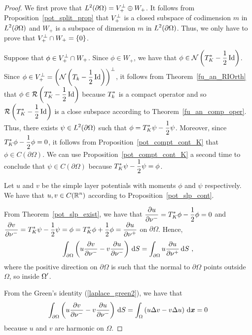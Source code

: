\begin{proof}
 We first prove that
$\displaystyle L^2(\partial \Omega) = V_+^\perp \oplus W_+$.  It
follows from Proposition~\ref{pot_split_prop} that
$\displaystyle V_+^\perp$ is a
closed subspace of codimension $m$ in
$\displaystyle L^2(\partial \Omega)$ and $W_+$
is a subspace of dimension $m$ in
$\displaystyle L^2(\partial \Omega)$.  Thus, we
only have to prove that $\displaystyle V_+^\perp \cap W_+ = \{0\}$.

Suppose that $\displaystyle \phi \in V_+^\perp \cap W_+$.
Since $\phi \in W_+$, we have that
$\displaystyle \phi \in \mathcal{N} \left(T^\ast_K - \frac{1}{2} \operatorname{Id}\right)$.
Since $\displaystyle \phi \in V_+^\perp
= \left(\mathcal{N} \left(T_k -\frac{1}{2} \operatorname{Id}\right)\right)^\perp$,
it follows from Theorem~\ref{fu_an_RIOrth} that
$\displaystyle \phi \in \mathcal{R} \left( T^\ast_K - \frac{1}{2} \operatorname{Id}\right)$
because $\displaystyle T_k^\ast$ is a compact operator
and so $\displaystyle \mathcal{R} \left( T^\ast_K - \frac{1}{2} \operatorname{Id}\right)$
is a close subspace according to Theorem~\ref{fu_an_comp_oper}.  Thus, there
exists $\displaystyle \psi \in L^2(\partial \Omega)$ such that
$\displaystyle \phi = T^\ast_K \psi - \frac{1}{2} \psi$.  Moreover,
since $\displaystyle T^\ast_K\phi - \frac{1}{2} \phi = 0$, it follows
from Proposition~\ref{pot_compt_cont_K} that
$\phi \in C(\partial \Omega)$.  We can use 
Proposition~\ref{pot_compt_cont_K} a second time to conclude that
$\psi \in C(\partial \Omega)$ because
$\displaystyle T^\ast_K \psi - \frac{1}{2} \psi = \phi$.

Let $u$ and $v$ be the simple layer potentials with moments $\phi$ and
$\psi$ respectively.  We have that $\displaystyle u,v \in C(\mathbb{R}^n)$
according to Proposition~\ref{pot_slp_cont}.

From Theorem~\ref{pot_slp_exist}, we have that
$\displaystyle \frac{\partial{u}}{\partial \nu^-} = T^\ast_K \phi - \frac{1}{2} \phi = 0$
and
$\displaystyle \frac{\partial{v}}{\partial \nu^-} = T^\ast_K \psi - \frac{1}{2} \psi
= \phi = T^\ast_K \phi + \frac{1}{2} \phi
= \frac{\partial{u}}{\partial \nu^+}$
on $\partial \Omega$.  Hence,
\begin{equation} \label{pot_L2_split1_E1}
\int_{\partial \Omega} \left( u \frac{\partial{v}}{\partial \nu^-}
- v \frac{\partial{u}}{\partial \nu^-} \right) \,\mathrm{d}{S}
= \int_{\partial \Omega} u \frac{\partial{u}}{\partial \nu^+} \,\mathrm{d}{S} \ ,
\end{equation}
where the positive direction on $\partial \Omega$ is such that the
normal to $\partial \Omega$ points outside $\Omega$, so inside
$\displaystyle \Omega^{\prime}$.

From the Green's identity (\ref{laplace_green2}), we have that
\begin{equation} \label{pot_L2_split1_E2}
\int_{\partial \Omega} \left( u \frac{\partial{v}}{\partial \nu^-}
- v \frac{\partial{u}}{\partial \nu^-} \right) \,\mathrm{d}{S}
= \int_\Omega \left( u \Delta v -  v \Delta u \right)
\,\mathrm{d}{{\bm{x}}} = 0
\end{equation}
because $u$ and $v$ are harmonic on $\Omega$.


\end{proof}
